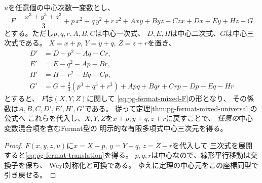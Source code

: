 \begin{corollary}[対角二次混合を含む全Fermat型]
\label{cor:pg-fermat-all-mixed}
$u$を任意個の中心次数一変数とし、
\begin{equation}
 F=\frac{x^3+y^3+z^3}{3}
 +p\,x^2+q\,y^2+r\,z^2+
 Axy+Byz+Czx+Dx+Ey+Hz+G
 \label{eq:pg-fermat-all-mixed}
\end{equation}
とする。ただし$p,q,r,A,B,C$は中心一次式、
$D,E,H$は中心二次式、$G$は中心三次式である。
$X=x+p$, $Y=y+q$, $Z=z+r$を置き、
\begin{equation}
 \begin{aligned}
 D'&=D-p^2-Aq-Cr,\\
 E'&=E-q^2-Ap-Br,\\
 H'&=H-r^2-Bq-Cp,\\
 G'&=G+\tfrac23(p^3+q^3+r^3)
     +Apq+Bqr+Crp-Dp-Eq-Hr
 \end{aligned}
 \label{eq:pg-fermat-translation}
\end{equation}
とすると、
$F$は$(X,Y,Z)$に関して
\eqref{eq:pg-fermat-mixed-F}の形となり、
その係数は$A,B,C,D',E',H',G'$である。
従って定理\ref{thm:pg-fermat-mixed-universal}の公式へ
これらを代入し、$X,Y,Z$を$x+p,y+q,z+r$に戻すことで、
\emph{任意の}中心変数混合項を含むFermat型の
明示的な有限多項式中心三次元を得る。
\end{corollary}
\begin{proof}
$F(x,y,z,u)$に$x=X-p$, $y=Y-q$, $z=Z-r$を代入して
三次式を展開すると\eqref{eq:pg-fermat-translation}を得る。
$p,q,r$は中心なので、線形平行移動は交換子を保ち、
Weyl対称化と可換である。
ゆえに定理の中心元をこの座標同型で引き戻せる。
\end{proof}

